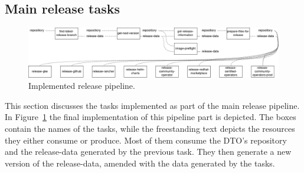 \subsection{Main release tasks}\label{subsec:main-release-tasks}

\begin{figure}[H]
    \centering
    \includegraphics[width=\textwidth]{img/implementation/release-pipeline.drawio}
    \caption{Implemented release pipeline.}
    \label{fig:implemented-release-pipeline}
\end{figure}

This section discusses the tasks implemented as part of the main release pipeline.
In Figure~\ref{fig:implemented-release-pipeline} the final implementation of this pipeline part is depicted.
The boxes contain the names of the tasks, while the freestanding text depicts the resources they either consume or produce.
Most of them consume the DTO's repository and the release-data generated by the previous task.
They then generate a new version of the release-data, amended with the data generated by the tasks.



\pagebreak



\pagebreak

















\pagebreak




